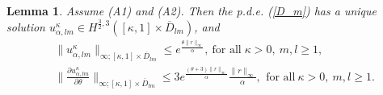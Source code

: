 \documentclass[11pt]{amsart}
\newtheorem{lemma}{\bf Lemma}[section]
\numberwithin{equation}{section}
\begin{document}
\begin{lemma} \label{lemma_estimate}
Assume (A1) and (A2).  Then the  p.d.e. (\ref{D_m}) has a unique solution $ u^{\kappa}_{\alpha,lm}\in  H^{\frac{3}{2},3}([\kappa, 1] \times \overline{D}_{lm}) $, and 
 \begin{eqnarray}
\label{bound1} & \|u^{\kappa}_{\alpha,lm}\|_{\infty; [\kappa, 1] \times \overline{D}_{lm}} \leq e^{\frac{\theta \|r\|_{\infty}}{\alpha}},  \  \mbox{for all}  \; \kappa >0 , \ m,l \geq 1,\ 
   \\
\label{bound2} & \Big\| \frac{\partial u^{\kappa}_{\alpha,lm}}{\partial \theta}  
\Big\|_{\infty ; [\kappa, 1] \times \overline{D}_{lm}} \leq
3 e^{\frac{(\theta+3)\|r\|_{\infty}}{\alpha}} \frac{\|r\|_{\infty}}{\alpha}, \, \ \mbox{for all} \ \kappa >0 , 
\ m,l \geq 1 .
\end{eqnarray} 
\end{lemma}
\end{document}
